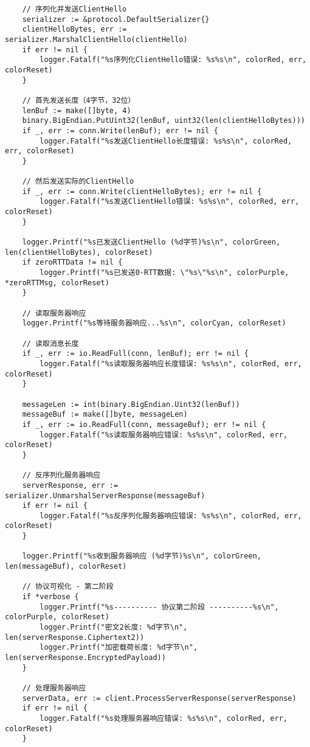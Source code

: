 \begin{verbatim}
    // 序列化并发送ClientHello
    serializer := &protocol.DefaultSerializer{}
    clientHelloBytes, err := serializer.MarshalClientHello(clientHello)
    if err != nil {
        logger.Fatalf("%s序列化ClientHello错误: %s%s\n", colorRed, err, colorReset)
    }

    // 首先发送长度（4字节，32位）
    lenBuf := make([]byte, 4)
    binary.BigEndian.PutUint32(lenBuf, uint32(len(clientHelloBytes)))
    if _, err := conn.Write(lenBuf); err != nil {
        logger.Fatalf("%s发送ClientHello长度错误: %s%s\n", colorRed, err, colorReset)
    }

    // 然后发送实际的ClientHello
    if _, err := conn.Write(clientHelloBytes); err != nil {
        logger.Fatalf("%s发送ClientHello错误: %s%s\n", colorRed, err, colorReset)
    }

    logger.Printf("%s已发送ClientHello (%d字节)%s\n", colorGreen, len(clientHelloBytes), colorReset)
    if zeroRTTData != nil {
        logger.Printf("%s已发送0-RTT数据: \"%s\"%s\n", colorPurple, *zeroRTTMsg, colorReset)
    }

    // 读取服务器响应
    logger.Printf("%s等待服务器响应...%s\n", colorCyan, colorReset)

    // 读取消息长度
    if _, err := io.ReadFull(conn, lenBuf); err != nil {
        logger.Fatalf("%s读取服务器响应长度错误: %s%s\n", colorRed, err, colorReset)
    }

    messageLen := int(binary.BigEndian.Uint32(lenBuf))
    messageBuf := make([]byte, messageLen)
    if _, err := io.ReadFull(conn, messageBuf); err != nil {
        logger.Fatalf("%s读取服务器响应错误: %s%s\n", colorRed, err, colorReset)
    }

    // 反序列化服务器响应
    serverResponse, err := serializer.UnmarshalServerResponse(messageBuf)
    if err != nil {
        logger.Fatalf("%s反序列化服务器响应错误: %s%s\n", colorRed, err, colorReset)
    }

    logger.Printf("%s收到服务器响应 (%d字节)%s\n", colorGreen, len(messageBuf), colorReset)

    // 协议可视化 - 第二阶段
    if *verbose {
        logger.Printf("%s---------- 协议第二阶段 ----------%s\n", colorPurple, colorReset)
        logger.Printf("密文2长度: %d字节\n", len(serverResponse.Ciphertext2))
        logger.Printf("加密载荷长度: %d字节\n", len(serverResponse.EncryptedPayload))
    }

    // 处理服务器响应
    serverData, err := client.ProcessServerResponse(serverResponse)
    if err != nil {
        logger.Fatalf("%s处理服务器响应错误: %s%s\n", colorRed, err, colorReset)
    }


\end{verbatim}
